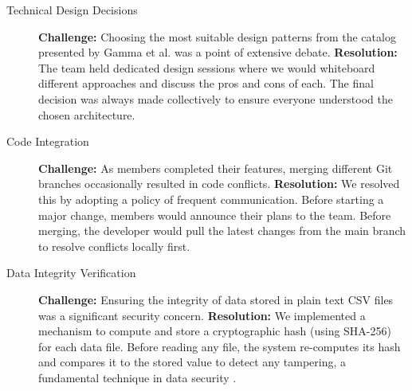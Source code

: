 \begin{description}
    \item[Technical Design Decisions]
    \textbf{Challenge:} Choosing the most suitable design patterns from the catalog presented by Gamma et al. \cite{GoF1994} was a point of extensive debate.
    \textbf{Resolution:} The team held dedicated design sessions where we would whiteboard different approaches and discuss the pros and cons of each. The final decision was always made collectively to ensure everyone understood the chosen architecture.

    \item[Code Integration]
    \textbf{Challenge:} As members completed their features, merging different Git branches occasionally resulted in code conflicts.
    \textbf{Resolution:} We resolved this by adopting a policy of frequent communication. Before starting a major change, members would announce their plans to the team. Before merging, the developer would pull the latest changes from the main branch to resolve conflicts locally first.

    \item[Data Integrity Verification]
    \textbf{Challenge:} Ensuring the integrity of data stored in plain text CSV files was a significant security concern.
    \textbf{Resolution:} We implemented a mechanism to compute and store a cryptographic hash (using SHA-256) for each data file. Before reading any file, the system re-computes its hash and compares it to the stored value to detect any tampering, a fundamental technique in data security \cite{Stallings2017}.
\end{description}